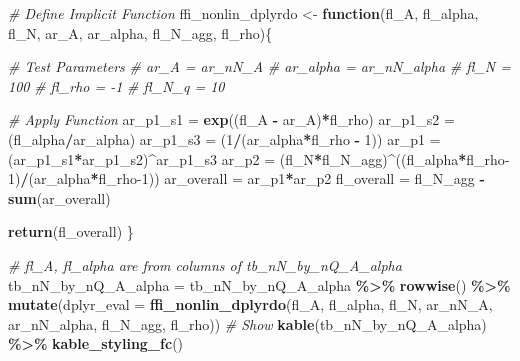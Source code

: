 \documentclass[
]{book}
\newenvironment{Shaded}{\begin{snugshade}}{\end{snugshade}}
\newcommand{\CommentTok}[1]{\textcolor[rgb]{0.56,0.35,0.01}{\textit{#1}}}
\newcommand{\ControlFlowTok}[1]{\textcolor[rgb]{0.13,0.29,0.53}{\textbf{#1}}}
\newcommand{\DataTypeTok}[1]{\textcolor[rgb]{0.13,0.29,0.53}{#1}}
\newcommand{\DecValTok}[1]{\textcolor[rgb]{0.00,0.00,0.81}{#1}}
\newcommand{\KeywordTok}[1]{\textcolor[rgb]{0.13,0.29,0.53}{\textbf{#1}}}
\newcommand{\NormalTok}[1]{#1}
\newcommand{\OperatorTok}[1]{\textcolor[rgb]{0.81,0.36,0.00}{\textbf{#1}}}
\newcommand{\StringTok}[1]{\textcolor[rgb]{0.31,0.60,0.02}{#1}}
\begin{document}
\begin{Shaded}
\begin{Highlighting}[]
\CommentTok{\# Define Implicit Function}
\NormalTok{ffi\_nonlin\_dplyrdo \textless{}{-}}\StringTok{ }\ControlFlowTok{function}\NormalTok{(fl\_A, fl\_alpha, fl\_N, ar\_A, ar\_alpha, fl\_N\_agg, fl\_rho)\{}

  \CommentTok{\# Test Parameters}
  \CommentTok{\# ar\_A = ar\_nN\_A}
  \CommentTok{\# ar\_alpha = ar\_nN\_alpha}
  \CommentTok{\# fl\_N = 100}
  \CommentTok{\# fl\_rho = {-}1}
  \CommentTok{\# fl\_N\_q = 10}

  \CommentTok{\# Apply Function}
\NormalTok{  ar\_p1\_s1 =}\StringTok{ }\KeywordTok{exp}\NormalTok{((fl\_A }\OperatorTok{{-}}\StringTok{ }\NormalTok{ar\_A)}\OperatorTok{*}\NormalTok{fl\_rho)}
\NormalTok{  ar\_p1\_s2 =}\StringTok{ }\NormalTok{(fl\_alpha}\OperatorTok{/}\NormalTok{ar\_alpha)}
\NormalTok{  ar\_p1\_s3 =}\StringTok{ }\NormalTok{(}\DecValTok{1}\OperatorTok{/}\NormalTok{(ar\_alpha}\OperatorTok{*}\NormalTok{fl\_rho }\OperatorTok{{-}}\StringTok{ }\DecValTok{1}\NormalTok{))}
\NormalTok{  ar\_p1 =}\StringTok{ }\NormalTok{(ar\_p1\_s1}\OperatorTok{*}\NormalTok{ar\_p1\_s2)}\OperatorTok{\^{}}\NormalTok{ar\_p1\_s3}
\NormalTok{  ar\_p2 =}\StringTok{ }\NormalTok{(fl\_N}\OperatorTok{*}\NormalTok{fl\_N\_agg)}\OperatorTok{\^{}}\NormalTok{((fl\_alpha}\OperatorTok{*}\NormalTok{fl\_rho}\DecValTok{{-}1}\NormalTok{)}\OperatorTok{/}\NormalTok{(ar\_alpha}\OperatorTok{*}\NormalTok{fl\_rho}\DecValTok{{-}1}\NormalTok{))}
\NormalTok{  ar\_overall =}\StringTok{ }\NormalTok{ar\_p1}\OperatorTok{*}\NormalTok{ar\_p2}
\NormalTok{  fl\_overall =}\StringTok{ }\NormalTok{fl\_N\_agg }\OperatorTok{{-}}\StringTok{ }\KeywordTok{sum}\NormalTok{(ar\_overall)}

  \KeywordTok{return}\NormalTok{(fl\_overall)}
\NormalTok{\}}

\CommentTok{\# fl\_A, fl\_alpha are from columns of tb\_nN\_by\_nQ\_A\_alpha}
\NormalTok{tb\_nN\_by\_nQ\_A\_alpha =}\StringTok{ }\NormalTok{tb\_nN\_by\_nQ\_A\_alpha }\OperatorTok{\%\textgreater{}\%}\StringTok{ }\KeywordTok{rowwise}\NormalTok{() }\OperatorTok{\%\textgreater{}\%}
\StringTok{                        }\KeywordTok{mutate}\NormalTok{(}\DataTypeTok{dplyr\_eval =} \KeywordTok{ffi\_nonlin\_dplyrdo}\NormalTok{(fl\_A, fl\_alpha, fl\_N,}
\NormalTok{                                                               ar\_nN\_A, ar\_nN\_alpha,}
\NormalTok{                                                               fl\_N\_agg, fl\_rho))}
\CommentTok{\# Show}
\KeywordTok{kable}\NormalTok{(tb\_nN\_by\_nQ\_A\_alpha) }\OperatorTok{\%\textgreater{}\%}
\StringTok{  }\KeywordTok{kable\_styling\_fc}\NormalTok{()}
\end{Highlighting}
\end{Shaded}
\end{document}
